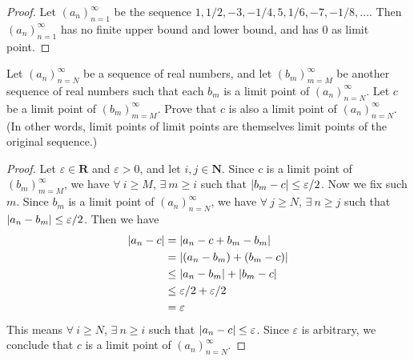 \begin{proof}
    Let \((a_n)_{n = 1}^\infty\) be the sequence \(1, 1/2, -3, -1/4, 5, 1/6, -7, -1/8, \dots\).
    Then \((a_n)_{n = 1}^\infty\) has no finite upper bound and lower bound, and has \(0\) as limit point.
\end{proof}

\begin{exercise}\label{ex 6.4.10}
    Let \((a_n)_{n = N}^\infty\) be a sequence of real numbers, and let \((b_m)_{m = M}^\infty\) be another sequence of real numbers such that each \(b_m\) is a limit point of \((a_n)_{n = N}^\infty\).
    Let \(c\) be a limit point of \((b_m)_{m = M}^\infty\).
    Prove that \(c\) is also a limit point of \((a_n)_{n = N}^\infty\).
    (In other words, limit points of limit points are themselves limit points of the original sequence.)
\end{exercise}

\begin{proof}
    Let \(\varepsilon \in \mathbf{R}\) and \(\varepsilon > 0\), and let \(i, j \in \mathbf{N}\).
    Since \(c\) is a limit point of \((b_m)_{m = M}^\infty\), we have \(\forall\ i \geq M\), \(\exists\ m \geq i\) such that \(\abs*{b_m - c} \leq \varepsilon / 2\).
    Now we fix such \(m\).
    Since \(b_m\) is a limit point of \((a_n)_{n = N}^\infty\), we have \(\forall\ j \geq N\), \(\exists\ n \geq j\) such that \(\abs*{a_n - b_m} \leq \varepsilon / 2\).
    Then we have
    \begin{align*}
        \abs*{a_n - c} & = \abs*{a_n - c + b_m - b_m}           \\
                       & = \abs*{(a_n - b_m) + (b_m - c)}       \\
                       & \leq \abs*{a_n - b_m} + \abs*{b_m - c} \\
                       & \leq \varepsilon / 2 + \varepsilon / 2 \\
                       & = \varepsilon
    \end{align*}
    This means \(\forall\ i \geq N\), \(\exists\ n \geq i\) such that \(\abs*{a_n - c} \leq \varepsilon\).
    Since \(\varepsilon\) is arbitrary, we conclude that \(c\) is a limit point of \((a_n)_{n = N}^\infty\).
\end{proof}